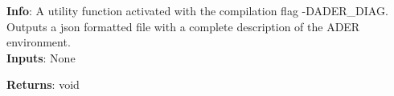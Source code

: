 \textbf{Info}: A utility function activated with the compilation flag 
-DADER\_DIAG. Outputs a json formatted file with a complete description of the
ADER environment.\\

\noindent \textbf{Inputs}: None

\noindent \textbf{Returns}: void
